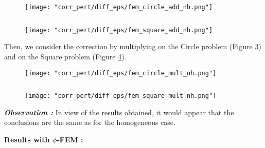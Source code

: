 \begin{enumerate}[label=\textbullet]
	\begin{minipage}{0.48\linewidth}
		\begin{figure}[H]
			\centering
			\texttt{[image: "corr\_pert/diff\_eps/fem\_circle\_add\_nh.png"]}
			\label{corr_pert_fem_circle_add_nh}
		\end{figure} 
	\end{minipage} $\qquad$
	\begin{minipage}{0.48\linewidth}
		\begin{figure}[H]
			\centering
			\texttt{[image: "corr\_pert/diff\_eps/fem\_square\_add\_nh.png"]}
			\label{corr_pert_fem_square_add_nh}
		\end{figure} 
	\end{minipage}
	
	Then, we consider the correction by multiplying on the Circle problem (Figure \ref{corr_pert_fem_circle_mult_nh}) and on the Square problem (Figure \ref{corr_pert_fem_square_mult_nh}).
	
	\begin{minipage}{0.48\linewidth}
		\begin{figure}[H]
			\centering
			\texttt{[image: "corr\_pert/diff\_eps/fem\_circle\_mult\_nh.png"]}
			\label{corr_pert_fem_circle_mult_nh}
		\end{figure} 
	\end{minipage} $\qquad$
	\begin{minipage}{0.48\linewidth}
		\begin{figure}[H]
			\centering
			\texttt{[image: "corr\_pert/diff\_eps/fem\_square\_mult\_nh.png"]}
			\label{corr_pert_fem_square_mult_nh}
		\end{figure} 
	\end{minipage}
	
	\textbf{\textit{Observation :}} In view of the results obtained, it would appear that the conclusions are the same as for the homogeneous case.
\end{enumerate}

\textbf{Results with $\phi$-FEM :}

